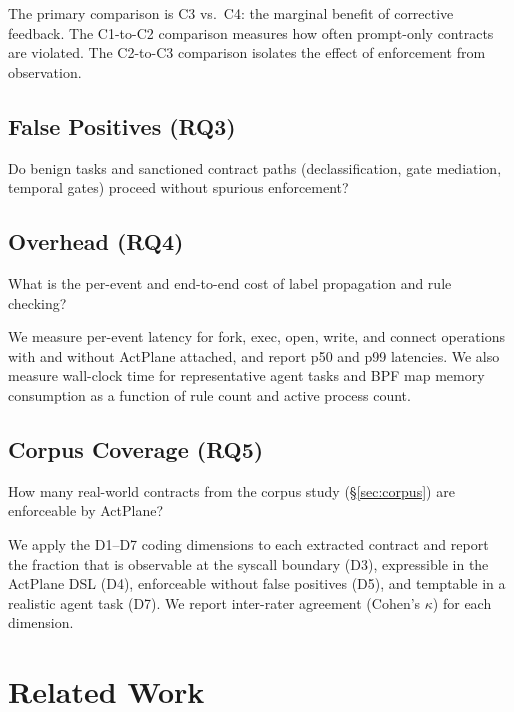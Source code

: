 The primary comparison is C3 vs.\ C4: the marginal benefit of corrective
feedback. The C1-to-C2 comparison measures how often prompt-only contracts
are violated. The C2-to-C3 comparison isolates the effect of enforcement
from observation.


\subsection{False Positives (RQ3)}

Do benign tasks and sanctioned contract paths (declassification, gate
mediation, temporal gates) proceed without spurious enforcement?


\subsection{Overhead (RQ4)}

What is the per-event and end-to-end cost of label propagation and rule
checking?

We measure per-event latency for fork, exec, open, write, and connect
operations with and without ActPlane attached, and report p50 and p99
latencies. We also measure wall-clock time for representative agent tasks
and BPF map memory consumption as a function of rule count and active
process count.


\subsection{Corpus Coverage (RQ5)}

How many real-world contracts from the corpus study
(\S\ref{sec:corpus}) are enforceable by ActPlane?

We apply the D1--D7 coding dimensions to each extracted contract and
report the fraction that is observable at the syscall boundary (D3),
expressible in the ActPlane DSL (D4), enforceable without false positives
(D5), and temptable in a realistic agent task (D7). We report inter-rater
agreement (Cohen's $\kappa$) for each dimension.



\section{Related Work}
\label{sec:related}


